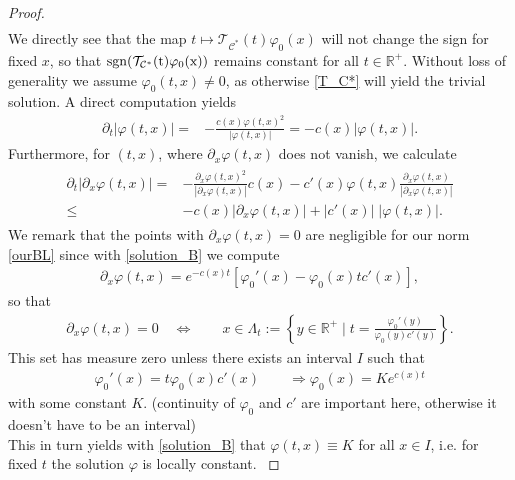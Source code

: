 \documentclass[12pt,a4paper]{amsart}
\renewcommand{\phi}{\varphi}
\newcommand{\R}{\mathbb{R}}
\begin{document}
\begin{proof}
\begin{align*}
    \end{align*}
\iffalse
We directly see that the map $t\mapsto \mathcal{T}_{\mathcal{C}^*}(t)\varphi_0(x)$ will not change the sign for fixed $x$, so that $\rm{sgn}(\mathcal{T}_{\mathcal{C}^*}(t)\varphi_0(x))$ remains constant for all $t\in \R^+$. Without loss of generality we assume $\varphi_0(t,x)\neq 0$, as otherwise \eqref{T_C*} will yield the trivial solution. A direct computation yields
    \begin{align}\label{estimates_B_sup}
    \partial_t |\phi(t,x)| =&-\frac{c(x)\varphi(t,x)^2}{|\varphi(t,x)|}= - c(x)  |\phi(t,x)|.
    \end{align}
Furthermore, for $(t,x)$, where $\partial_x \varphi(t,x)$ does not vanish, we calculate
    \begin{align}
    \label{estimates_B_derivative_sup}
    \begin{split}
    \partial_t |\partial_x \phi(t,x)| =&-\frac{\partial_x\varphi(t,x)^2}{|\partial_x\varphi(t,x)|}c(x)-c'(x)\varphi(t,x)\frac{\partial_x\varphi(t,x)}{|\partial_x\varphi(t,x)|}\\
     \leq&   - c(x) |\partial_x \phi(t,x)| + |c'(x)| \; |\phi(t,x)|.
     \end{split}
    \end{align}
{\color{red}
We remark that the points with $\partial_x\varphi(t,x)=0$ are negligible for our norm \eqref{ourBL} since with \eqref{solution_B} we compute
    \begin{align*}
    \partial_x\varphi(t,x)=e^{-c(x)t}\left[\varphi_0'(x)-\varphi_0(x)tc'(x)\right],
    \end{align*}
so that
    \begin{align*}
        \partial_x\varphi(t,x)=0\quad \Leftrightarrow \qquad x\in \Lambda_t:= \left\{y\in \R^+\mid t=\frac{\varphi_0'(y)}{\varphi_0(y)c'(y)}\right\}.
    \end{align*}
This set has measure zero unless there exists an interval $I$ such that 
    \begin{align*}
        \varphi_0'(x)=t\varphi_0(x)c'(x)\qquad \Rightarrow \varphi_0(x)=Ke^{c(x)t}
    \end{align*}
    with some constant $K$.
    (continuity of $\varphi_0$ and $c'$ are important here, otherwise it doesn't have to be an interval)\\
    This in turn yields with \eqref{solution_B} that $\varphi(t,x)\equiv K$ for all $x\in I$, i.e. for fixed $t$ the solution $\varphi$ is locally constant.
    }


\end{proof}
\end{document}
